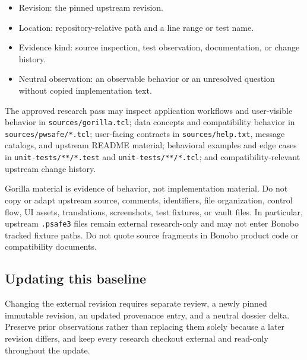 \documentclass[
  letterpaper,
]{article}
\newcommand{\passthrough}[1]{#1}
\providecommand{\tightlist}{%
  \setlength{\itemsep}{0pt}\setlength{\parskip}{0pt}}
\begin{document}
\begin{itemize}
\tightlist
\item
  Revision: the pinned upstream revision.
\item
  Location: repository-relative path and a line range or test name.
\item
  Evidence kind: source inspection, test observation, documentation, or change history.
\item
  Neutral observation: an observable behavior or an unresolved question without copied implementation text.
\end{itemize}

The approved research pass may inspect application workflows and user-visible behavior in
\nolinkurl{sources/gorilla.tcl}; data concepts and compatibility behavior in \nolinkurl{sources/pwsafe/*.tcl};
user-facing contracts in \nolinkurl{sources/help.txt}, message catalogs, and upstream README material; behavioral
examples and edge cases in \nolinkurl{unit-tests/**/*.test} and \nolinkurl{unit-tests/**/*.tcl}; and
compatibility-relevant upstream change history.

Gorilla material is evidence of behavior, not implementation material. Do not copy or adapt upstream source, comments,
identifiers, file organization, control flow, UI assets, translations, screenshots, test fixtures, or vault files. In
particular, upstream \passthrough{\lstinline!.psafe3!} files remain external research-only and may not enter Bonobo
tracked fixture paths. Do not quote source fragments in Bonobo product code or compatibility documents.

\subsection{Updating this baseline}\label{updating-this-baseline}

Changing the external revision requires separate review, a newly pinned immutable revision, an updated provenance entry,
and a neutral dossier delta. Preserve prior observations rather than replacing them solely because a later revision
differs, and keep every research checkout external and read-only throughout the update.
\end{document}

